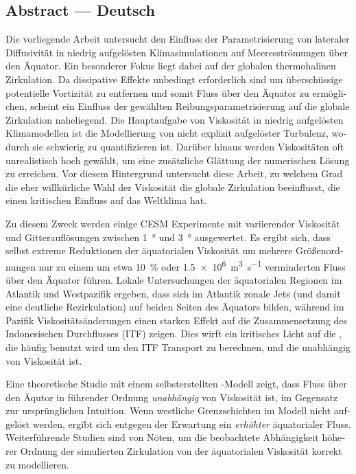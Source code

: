 \clearpage

\begin{otherlanguage}{german}
\section*{Abstract --- Deutsch}

Die vorliegende Arbeit untersucht den Einfluss der Parametrisierung von lateraler Diffusivität in niedrig aufgelösten Klimasimulationen auf Meeresströmungen über den Äquator. Ein besonderer Fokus liegt dabei auf der globalen thermohalinen Zirkulation. Da dissipative Effekte unbedingt erforderlich sind um überschüssige potentielle Vortizität zu entfernen und somit Fluss über den Äquator zu ermöglichen, scheint ein Einfluss der gewählten Reibungsparametrisierung auf die globale Zirkulation naheliegend. Die Hauptaufgabe von Viskosität in niedrig aufgelösten Klimamodellen ist die Modellierung von nicht explizit aufgelöster Turbulenz, wodurch sie schwierig zu quantifizieren ist. Darüber hinaus werden Viskositäten oft unrealistisch hoch gewählt, um eine zusätzliche Glättung der numerischen Lösung zu erreichen. Vor diesem Hintergrund untersucht diese Arbeit, zu welchem Grad die eher willkürliche Wahl der Viskosität die globale Zirkulation beeinflusst, die einen kritischen Einfluss auf das Weltklima hat.

Zu diesem Zweck werden einige \acf{CESM} Experimente mit variierender Viskosität und Gitterauflösungen zwischen \SI{1}{\degree} und \SI{3}{\degree} ausgewertet. Es ergibt sich, dass selbst extreme Reduktionen der äquatorialen Viskosität um mehrere Größenordnungen nur zu einem um etwa \SI{10}{\percent} oder \SI{1.5e6}{\metre\cubed\per\second} verminderten Fluss über den Äquator führen. Lokale Untersuchungen der äquatorialen Regionen im Atlantik und Westpazifik ergeben, dass sich im Atlantik zonale Jets (und damit eine deutliche Rezirkulation) auf beiden Seiten des Äquators bilden, während im Pazifik Viskositätsänderungen einen starken Effekt auf die Zusammensetzung des Indonesischen Durchflusses (\acs{ITF}) zeigen. Dies wirft ein kritisches Licht auf die , die häufig benutzt wird um den \ac{ITF} Transport zu berechnen, und die unabhängig von Viskosität ist.

Eine theoretische Studie mit einem selbsterstellten -Modell zeigt, dass Fluss über den Äqutor in führender Ordnung \emph{unabhängig} von Viskosität ist, im Gegensatz zur ursprünglichen Intuition. Wenn westliche Grenzschichten im Modell nicht aufgelöst werden, ergibt sich entgegen der Erwartung ein \emph{erhöhter} äquatorialer Fluss. Weiterführende Studien sind von Nöten, um die beobachtete Abhängigkeit höherer Ordnung der simulierten Zirkulation von der äquatorialen Viskosität korrekt zu modellieren.

\end{otherlanguage}

\clearpage